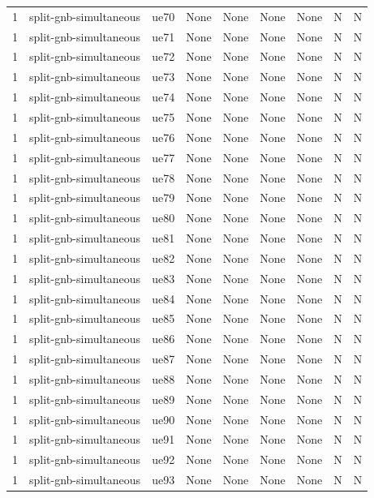 \begin{table}[ht]
\begin{tabular}{|c|c|c|c|c|c|c|c|c|}
1 & split-gnb-simultaneous & ue70 & None & None & None & None & N & N \\
1 & split-gnb-simultaneous & ue71 & None & None & None & None & N & N \\
1 & split-gnb-simultaneous & ue72 & None & None & None & None & N & N \\
1 & split-gnb-simultaneous & ue73 & None & None & None & None & N & N \\
1 & split-gnb-simultaneous & ue74 & None & None & None & None & N & N \\
1 & split-gnb-simultaneous & ue75 & None & None & None & None & N & N \\
1 & split-gnb-simultaneous & ue76 & None & None & None & None & N & N \\
1 & split-gnb-simultaneous & ue77 & None & None & None & None & N & N \\
1 & split-gnb-simultaneous & ue78 & None & None & None & None & N & N \\
1 & split-gnb-simultaneous & ue79 & None & None & None & None & N & N \\
1 & split-gnb-simultaneous & ue80 & None & None & None & None & N & N \\
1 & split-gnb-simultaneous & ue81 & None & None & None & None & N & N \\
1 & split-gnb-simultaneous & ue82 & None & None & None & None & N & N \\
1 & split-gnb-simultaneous & ue83 & None & None & None & None & N & N \\
1 & split-gnb-simultaneous & ue84 & None & None & None & None & N & N \\
1 & split-gnb-simultaneous & ue85 & None & None & None & None & N & N \\
1 & split-gnb-simultaneous & ue86 & None & None & None & None & N & N \\
1 & split-gnb-simultaneous & ue87 & None & None & None & None & N & N \\
1 & split-gnb-simultaneous & ue88 & None & None & None & None & N & N \\
1 & split-gnb-simultaneous & ue89 & None & None & None & None & N & N \\
1 & split-gnb-simultaneous & ue90 & None & None & None & None & N & N \\
1 & split-gnb-simultaneous & ue91 & None & None & None & None & N & N \\
1 & split-gnb-simultaneous & ue92 & None & None & None & None & N & N \\
1 & split-gnb-simultaneous & ue93 & None & None & None & None & N & N \\

\end{tabular}
\end{table}
